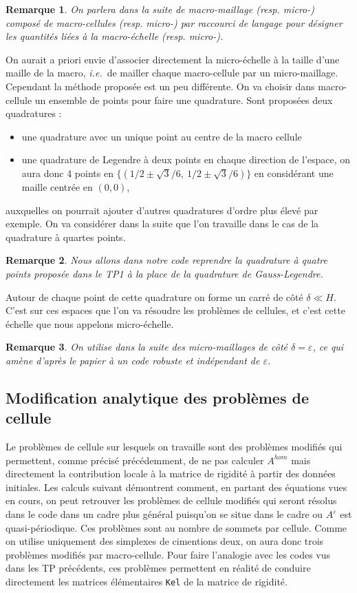 \documentclass[11pt]{article}
\newtheorem{rmq}{Remarque}
\newcommand{\Ah}{A^{hom}}
\newcommand{\Ae}{A^\varepsilon}
\newcommand{\ie}{\emph{i.e.{}}~}
\begin{document}
\begin{rmq}
  On parlera dans la suite de macro-maillage (resp. micro-) composé de macro-cellules (resp. micro-) par raccourci de langage pour désigner
  les quantités liées à la macro-échelle (resp. micro-). 
\end{rmq}

On aurait a priori envie d'associer directement la micro-échelle à la taille d'une maille de la macro, \ie de mailler chaque macro-cellule par un
micro-maillage. Cependant la méthode proposée est un peu différente. On va choisir dans macro-cellule un ensemble de points pour faire une quadrature.
Sont proposées deux quadratures :
\begin{itemize}
\item une quadrature avec un unique point au centre de la macro cellule
\item une quadrature de Legendre à deux points en chaque direction de l'espace, on aura donc 4 points en $\{(1/2 \pm \sqrt{3}/6,~1/2 \pm \sqrt{3}/6)\}$
  en considérant une maille centrée en $(0, 0)$,
\end{itemize}
auxquelles on pourrait ajouter d'autres quadratures d'ordre plus élevé par exemple. On va considérer dans la suite que l'on travaille dans le cas de la
quadrature à quartes points.

\begin{rmq}
  Nous allons dans notre code reprendre la quadrature à quatre points proposée dans le TP1 à la place de la quadrature de Gauss-Legendre.
\end{rmq}

Autour de chaque point de cette quadrature on forme un carré de côté $\delta \ll H$. C'est sur ces espaces que l'on va résoudre les problèmes de
cellules, et c'est cette échelle que nous appelons micro-échelle. 

\begin{rmq}
  On utilise dans la suite des micro-maillages de côté $\delta = \varepsilon$, ce qui amène d'après le papier à un code robuste et indépendant de
  $\varepsilon$. 
\end{rmq}


\subsection{Modification analytique des problèmes de cellule}

Le problèmes de cellule sur lesquels on travaille sont des problèmes modifiés qui permettent, comme précisé précédemment, de ne pas calculer $\Ah$
mais directement la contribution locale à la matrice de rigidité à partir des données initiales. Les calculs suivant démontrent comment, en partant
des équations vues en cours, on peut retrouver les problèmes de cellule modifiés qui seront résolus dans le code dans un cadre plus général puisqu'on
se situe dans le cadre ou $\Ae$ est quasi-périodique. Ces problèmes sont au nombre de sommets par cellule. Comme on utilise uniquement des simplexes
de cimentions deux, on aura donc trois problèmes modifiés par macro-cellule. Pour faire l'analogie avec les codes vus dans les TP précédents, ces
problèmes permettent en réalité de conduire directement les matrices élémentaires \texttt{Kel} de la matrice de rigidité.
\end{document}
